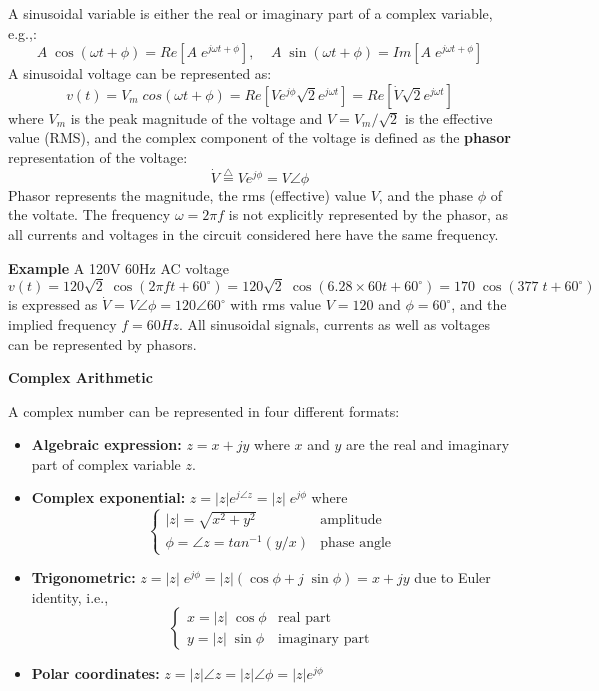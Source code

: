A sinusoidal variable is either the real or imaginary part of a complex
variable, e.g.,:
\[	A\;\cos(\omega t+\phi)=Re[A\;e^{j\omega t+\phi}],\;\;\;\;
	A\;\sin(\omega t+\phi)=Im[A\;e^{j\omega t+\phi}]	\]
A sinusoidal voltage can be represented as:
\[	v(t)=V_m\;cos(\omega t+\phi)=Re[V e^{j\phi} \sqrt{2}e^{j\omega t}] 
	=Re[\dot{V} \sqrt{2} e^{j\omega t}] \]
where $V_m$ is the peak magnitude of the voltage and $V=V_m/\sqrt{2}$ is the
effective value (RMS), and the complex component of the voltage is defined 
as the {\bf phasor} representation of the voltage:
\[	\dot{V}\stackrel{\triangle}{=}V e^{j\phi} =V \angle \phi	\]
Phasor represents the magnitude, the rms (effective) value $V$, and the 
phase $\phi$ of the voltate. The frequency $\omega=2\pi f$ is not explicitly 
represented by the phasor, as all currents and voltages in the circuit 
considered here have the same frequency.

{\bf Example} A 120V 60Hz AC voltage 
\[	v(t)=120 \sqrt{2}\; \cos(2\pi f t+60^\circ)
	=120\sqrt{2}\; \cos(6.28\times 60 t+60^\circ)
	=170\;\cos(377\;t+60^\circ)	\]
is expressed as $\dot{V}=V \angle \phi= 120 \angle 60^\circ$ with rms
value $V=120$ and $\phi=60^\circ$, and the implied frequency $f=60Hz$. 
All sinusoidal signals, currents as well as voltages can be represented
by phasors.

{\bf Complex Arithmetic} 

A complex number can be represented in four different formats:
\begin{itemize}
\item {\bf Algebraic expression:} $z=x+jy$ where $x$ and $y$ are the
	real and imaginary part of complex variable $z$.
\item {\bf Complex exponential:} $z=|z|e^{j\angle z}=|z|\;e^{j\phi}$ where 
\[ \left\{ \begin{array}{ll} |z|=\sqrt{x^2+y^2} & \mbox{amplitude}\\
			\phi=\angle z=tan^{-1} (y/x) & \mbox{phase angle}
	\end{array} \right. \]
\item {\bf Trigonometric:} $z=|z|\;e^{j\phi}=|z|(\cos\phi+j\;\sin\phi)=x+jy$
	due to Euler identity, i.e.,
\[ \left\{ \begin{array}{ll} x=|z|\;\cos\phi & \mbox{real part}\\
			      y=|z|\;\sin\phi & \mbox{imaginary part}
	\end{array} \right. \]
\item {\bf Polar coordinates:} $z=|z|\angle z=|z|\angle \phi=|z| e^{j\phi}$
\end{itemize}

